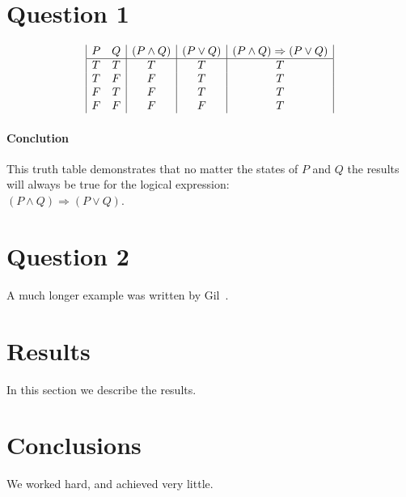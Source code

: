 \documentclass[12pt]{article}
\begin{document}
\maketitle


\section*{Question 1}
\begin{displaymath}
\begin{array}{|c c|c|c|c|}

P & Q & (P \land Q) & (P \lor Q) & (P \land Q) \Rightarrow (P \lor Q)\\
\hline 
T & T & T & T & T\\
T & F & F & T & T\\
F & T & F & T & T\\
F & F & F & F & T\\
\end{array}
\end{displaymath}

\paragraph{Conclution}
This truth table demonstrates that no matter the states of $P$ and $Q$ the results will always be true for the logical expression:\\ $(P \land Q) \Rightarrow (P \lor Q)$.

\section*{Question 2}
A much longer \LaTeXe{} example was written by Gil~\cite{Gil:02}.

\section{Results}\label{results}
In this section we describe the results.

\section{Conclusions}\label{conclusions}
We worked hard, and achieved very little.



\end{document}
